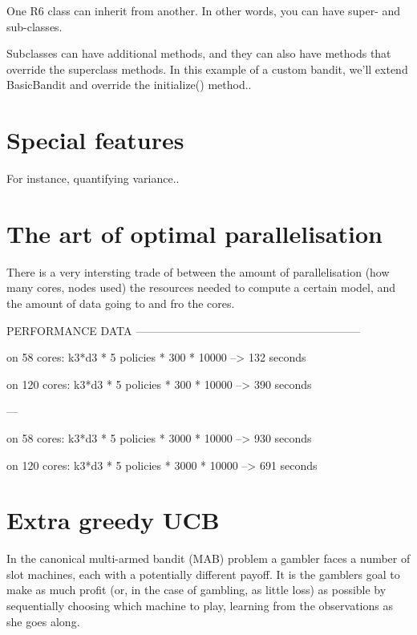 \documentclass[nojss]{jss}
\begin{document}
One R6 class can inherit from another. In other words, you can have super- and sub-classes.

Subclasses can have additional methods, and they can also have methods that override the superclass methods. In this example of a custom  bandit, we’ll extend BasicBandit and override the initialize() method..

\section{Special features}

For instance, quantifying variance..

\section{The art of optimal parallelisation}

There is a very intersting trade of between the amount of parallelisation (how many cores, nodes used) the resources needed to compute a certain model, and the amount of data going to and fro the cores.

PERFORMANCE DATA  ------------------------------------------------------------

on 58  cores:    k3*d3 * 5 policies * 300  * 10000 --\textgreater{} 132 seconds

on 120 cores:    k3*d3 * 5 policies * 300  * 10000 --\textgreater{} 390 seconds

---

on 58  cores:    k3*d3 * 5 policies * 3000 * 10000 --\textgreater{} 930 seconds

on 120 cores:    k3*d3 * 5 policies * 3000 * 10000 --\textgreater{} 691 seconds



\section{Extra greedy UCB}

In the canonical multi-armed bandit (MAB) problem a gambler faces a number of slot machines, each with a potentially different payoff. It is the gamblers goal to make as much profit (or, in the case of gambling, as little loss) as possible by sequentially choosing which machine to play, learning from the observations as she goes along.
\end{document}
